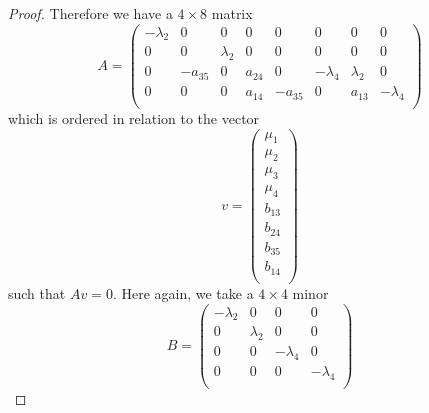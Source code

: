 \documentclass[12pt]{article}
\begin{document}
\begin{proof}
Therefore we have a $4\times 8$ matrix \[
A=\begin{pmatrix}
-\lambda_2 & 0 & 0 & 0 & 0 & 0 & 0 & 0\\
0 & 0 & \lambda_2 & 0 & 0 & 0 & 0 & 0\\
0 & -a_{35} & 0 & a_{24} & 0 & -\lambda_4 & \lambda_2 & 0\\
0 & 0 & 0 & a_{14} & -a_{35} & 0 & a_{13} & -\lambda_4\\
\end{pmatrix}
\]
which is ordered in relation to the vector \[
v=\begin{pmatrix}
\mu_1\\
\mu_2\\
\mu_3\\
\mu_4\\
b_{13}\\
b_{24}\\
b_{35}\\
b_{14}\\
\end{pmatrix}
\]
such that $Av=0$. Here again, we take a $4\times 4$ minor \[B=\begin{pmatrix}
-\lambda_2 & 0 & 0 & 0\\
0 & \lambda_2 & 0 & 0\\
0 & 0 & -\lambda_4 & 0\\
0 & 0 & 0 & -\lambda_4\\
\end{pmatrix}\]

\end{proof}
\end{document}
